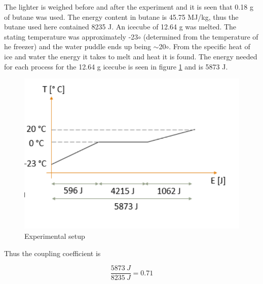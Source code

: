 The lighter is weighed before and after the experiment and it is seen that 0.18 g of butane was used. The energy content in butane is 45.75 MJ/kg, thus the butane used here contained 8235 J. An icecube of 12.64 g was melted. The stating temperature was approximately -23$\circ$ (determined from the temperature of he freezer) and the water puddle ends up being $\sim$20$\circ$. From the specific heat of ice and water the energy it takes to melt and heat it is found. The energy needed for each process for the 12.64 g icecube is seen in figure \ref{fig:lucascouplinggraf} and is 5873 J.
\begin{figure}[htb]
\begin{center}
\includegraphics[scale=0.8]{figures/navtheory/couplinggraf}
\caption{Experimental setup}
\label{fig:lucascouplinggraf}
\end{center}
\end{figure}

Thus the coupling coefficient is 

\begin{equation}
\dfrac{5873\ J}{8235 \ J}= 0.71
\end{equation}





